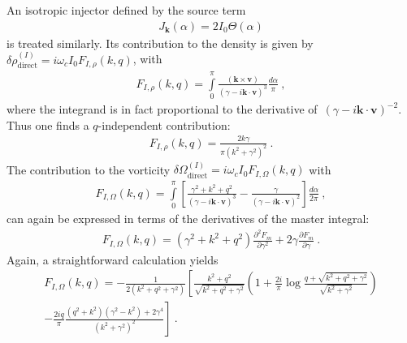 \documentclass[preprint,aps,eqsecnum]{revtex4-1}
\newcommand{\dct}[1]{{#1}_\mathrm{direct}}
\begin{document}
An isotropic injector defined by the source term
\begin{align}
  J_{\bm k}(\alpha) = 2I_0 \Theta(\alpha)
\end{align}
is treated similarly.
Its contribution to the density is given by
$\delta\dct{\rho}^{(I)} = i \omega_c I_0 F_{I, \rho}(k, q)$, with
\begin{align}
  F_{I, \rho}(k, q) = \int\limits_{0}^{\pi} \frac{({\bm k}\times{\bm v})}{
     \left(\gamma - i {\bm k} \cdot{\bm v}\right)^3} \frac{d\alpha}{\pi}\ , 
\end{align}
where the integrand is in fact proportional to the derivative
of~$(\gamma - i {\bm k}\cdot{\bm v})^{-2}$. Thus one finds
a $q$-independent contribution:
\begin{align}
  F_{I, \rho}(k, q) = \frac{2k\gamma}{\pi (k^2 + \gamma^2)^2}\ . 
\end{align}
The contribution to the vorticity
$\delta\dct{\Omega}^{(I)} = i \omega_c I_0 F_{I, \Omega}(k, q)$ with
\begin{align}
  F_{I, \Omega}(k, q) = \int\limits_{0}^{\pi} \left[
  \frac{\gamma^2 + k^2 + q^2}{\left(\gamma - i {\bm k}\cdot{\bm v}\right)^3}
  - \frac{\gamma}{\left(\gamma - i {\bm k}\cdot{\bm v}\right)^2}
  \right]
  \frac{d\alpha}{2\pi}\ , 
\end{align}
can again be expressed in terms of the derivatives of the master integral:
\begin{align}
  F_{I, \Omega}(k, q) = \left(\gamma^2 + k^2 + q^2 \right)
  \frac{\partial^2 F_m}{\partial \gamma^2}
  + 2 \gamma \frac{\partial F_m}{\partial\gamma}\ . 
\end{align}
Again, a straightforward calculation yields
\begin{align}
  F_{I, \Omega}(k, q) = -\frac{1}{2 \left(k^2 + q^2 + \gamma^2\right)}
  \left[
  \frac{k^2 + q^2}{\sqrt{k^2 + q^2 + \gamma^2}}
  \left(
  1 + \frac{2i}{\pi} \log\frac{q + \sqrt{k^2 + q^2 + \gamma^2}}{
                           \sqrt{k^2 + \gamma^2}}
  \right) \right. \\ \nonumber
  - \left.\frac{2iq}{\pi} \frac{(q^2 + k^2)(\gamma^2 - k^2) + 2 \gamma^4}{
  (k^2 + \gamma^2)^2}
  \right]\ . 
\end{align}
\end{document}
